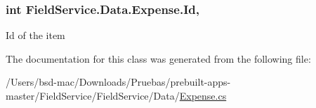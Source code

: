 \hypertarget{class_field_service_1_1_data_1_1_expense_aa52fab6bcef532f409acbc1b74efc8a2}{
\subsubsection[{Id}]{\setlength{\rightskip}{0pt plus 5cm}int Field\+Service.\+Data.\+Expense.\+Id\hspace{0.3cm}{\ttfamily [get]}, {\ttfamily [set]}}}\label{class_field_service_1_1_data_1_1_expense_aa52fab6bcef532f409acbc1b74efc8a2}


Id of the item 



The documentation for this class was generated from the following file\+:\begin{DoxyCompactItemize}
\item 
/\+Users/bsd-\/mac/\+Downloads/\+Pruebas/prebuilt-\/apps-\/master/\+Field\+Service/\+Field\+Service/\+Data/\hyperlink{_expense_8cs}{Expense.\+cs}\end{DoxyCompactItemize}

